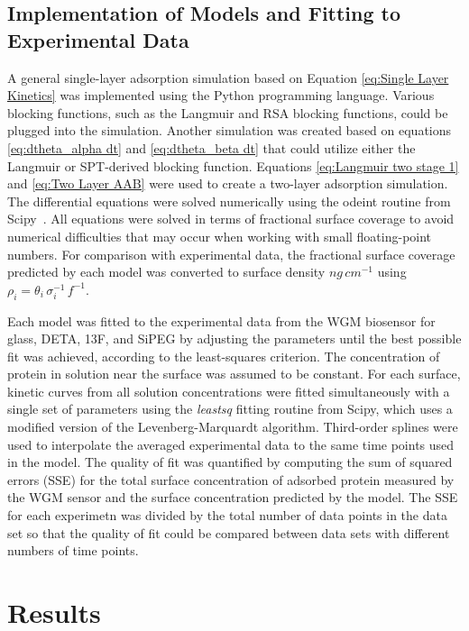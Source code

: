 \subsection{Implementation of Models and Fitting to Experimental Data}

A general single-layer adsorption simulation based on Equation \ref{eq:Single Layer Kinetics}
was implemented using the Python programming language. Various blocking
functions, such as the Langmuir and RSA blocking functions, could
be plugged into the simulation. Another simulation was created based
on equations \ref{eq:dtheta_alpha dt} and \ref{eq:dtheta_beta dt}
that could utilize either the Langmuir or SPT-derived blocking function.
Equations \ref{eq:Langmuir two stage 1} and \ref{eq:Two Layer AAB}
were used to create a two-layer adsorption simulation. The differential
equations were solved numerically using the odeint routine from Scipy~\cite{Jones2001-}.
All equations were solved in terms of fractional surface coverage
to avoid numerical difficulties that may occur when working with small
floating-point numbers. For comparison with experimental data, the
fractional surface coverage predicted by each model was converted
to surface density $ng\, cm^{-1}$ using $\rho_{i}=\theta_{i}\,\sigma_{i}^{-1}\, f^{-1}$. 

Each model was fitted to the experimental data from the WGM biosensor
for glass, DETA, 13F, and SiPEG by adjusting the parameters until
the best possible fit was achieved, according to the least-squares
criterion. The concentration of protein in solution near the surface
was assumed to be constant. For each surface, kinetic curves from
all solution concentrations were fitted simultaneously with a single
set of parameters using the \emph{leastsq} fitting routine from Scipy,
which uses a modified version of the Levenberg-Marquardt algorithm.
Third-order splines were used to interpolate the averaged experimental
data to the same time points used in the model. The quality of fit
was quantified by computing the sum of squared errors (SSE) for the
total surface concentration of adsorbed protein measured by the WGM
sensor and the surface concentration predicted by the model. The SSE
for each experimetn was divided by the total number of data points
in the data set so that the quality of fit could be compared between
data sets with different numbers of time points. 


\section{Results}


